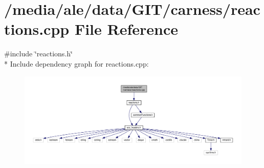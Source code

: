 \hypertarget{a00042}{\section{/media/ale/data/\-G\-I\-T/carness/reactions.cpp File Reference}
\label{a00042}
}
{\ttfamily \#include \char`\"{}reactions.\-h\char`\"{}}\\*
Include dependency graph for reactions.\-cpp\-:\nopagebreak
\begin{figure}[H]
\begin{center}
\leavevmode
\includegraphics[width=350pt]{a00076}
\end{center}
\end{figure}
